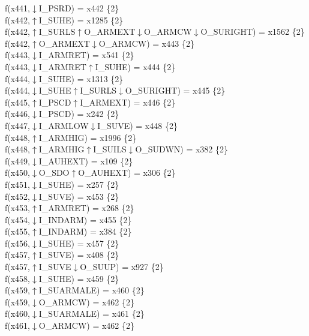f(x441,$\downarrow$I\_PSRD) = x442 \{2\} \\  
f(x442,$\uparrow$I\_SUHE) = x1285 \{2\} \\  
f(x442,$\uparrow$I\_SURLS$\uparrow$O\_ARMEXT$\downarrow$O\_ARMCW$\downarrow$O\_SURIGHT) = x1562 \{2\} \\  
f(x442,$\uparrow$O\_ARMEXT$\downarrow$O\_ARMCW) = x443 \{2\} \\  
f(x443,$\downarrow$I\_ARMRET) = x541 \{2\} \\  
f(x443,$\downarrow$I\_ARMRET$\uparrow$I\_SUHE) = x444 \{2\} \\  
f(x444,$\downarrow$I\_SUHE) = x1313 \{2\} \\  
f(x444,$\downarrow$I\_SUHE$\uparrow$I\_SURLS$\downarrow$O\_SURIGHT) = x445 \{2\} \\  
f(x445,$\uparrow$I\_PSCD$\uparrow$I\_ARMEXT) = x446 \{2\} \\  
f(x446,$\downarrow$I\_PSCD) = x242 \{2\} \\  
f(x447,$\downarrow$I\_ARMLOW$\downarrow$I\_SUVE) = x448 \{2\} \\  
f(x448,$\uparrow$I\_ARMHIG) = x1996 \{2\} \\  
f(x448,$\uparrow$I\_ARMHIG$\uparrow$I\_SUILS$\downarrow$O\_SUDWN) = x382 \{2\} \\  
f(x449,$\downarrow$I\_AUHEXT) = x109 \{2\} \\  
f(x450,$\downarrow$O\_SDO$\uparrow$O\_AUHEXT) = x306 \{2\} \\  
f(x451,$\downarrow$I\_SUHE) = x257 \{2\} \\  
f(x452,$\downarrow$I\_SUVE) = x453 \{2\} \\  
f(x453,$\uparrow$I\_ARMRET) = x268 \{2\} \\  
f(x454,$\downarrow$I\_INDARM) = x455 \{2\} \\  
f(x455,$\uparrow$I\_INDARM) = x384 \{2\} \\  
f(x456,$\downarrow$I\_SUHE) = x457 \{2\} \\  
f(x457,$\uparrow$I\_SUVE) = x408 \{2\} \\  
f(x457,$\uparrow$I\_SUVE$\downarrow$O\_SUUP) = x927 \{2\} \\  
f(x458,$\downarrow$I\_SUHE) = x459 \{2\} \\  
f(x459,$\uparrow$I\_SUARMALE) = x460 \{2\} \\  
f(x459,$\downarrow$O\_ARMCW) = x462 \{2\} \\  
f(x460,$\downarrow$I\_SUARMALE) = x461 \{2\} \\  
f(x461,$\downarrow$O\_ARMCW) = x462 \{2\} \\  
